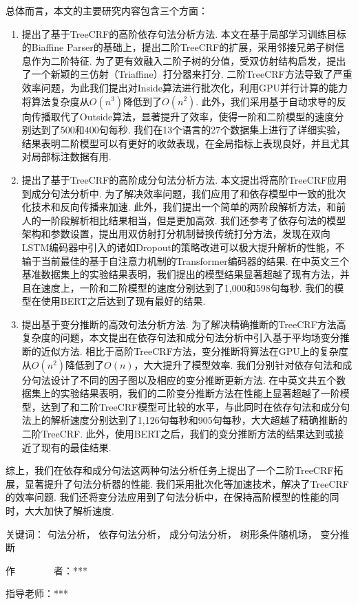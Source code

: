\begin{cabstract}
	总体而言，本文的主要研究内容包含三个方面：
	\begin{enumerate}
		\item 提出了基于TreeCRF的高阶依存句法分析方法.
		      本文在基于局部学习训练目标的Biaffine Parser的基础上，提出二阶TreeCRF的扩展，采用邻接兄弟子树信息作为二阶特征.
		      为了更有效融入二阶子树的分值，受双仿射结构启发，提出了一个新颖的三仿射（Triaffine）打分器来打分.
		      二阶TreeCRF方法导致了严重效率问题，为此我们提出对Inside算法进行批次化，利用GPU并行计算的能力将算法复杂度从$O(n^3)$降低到了$O(n^2)$.
		      此外，我们采用基于自动求导的反向传播取代了Outside算法，显著提升了效率，使得一阶和二阶模型的速度分别达到了500和400句每秒.
		      我们在13个语言的27个数据集上进行了详细实验，结果表明二阶模型可以有更好的收敛表现，在全局指标上表现良好，并且尤其对局部标注数据有用.
		\item 提出了基于TreeCRF的高阶成分句法分析方法.
		      本文提出将高阶TreeCRF应用到成分句法分析中.
		      为了解决效率问题，我们应用了和依存模型中一致的批次化技术和反向传播来加速.
		      此外，我们提出一个简单的两阶段解析方法，和前人的一阶段解析相比结果相当，但是更加高效.
		      我们还参考了依存句法的模型架构和参数设置，提出用双仿射打分机制替换传统打分方法，发现在双向LSTM编码器中引入的诸如Dropout的策略改进可以极大提升解析的性能，不输于当前最佳的基于自注意力机制的Transformer编码器的结果.
		      在中英文三个基准数据集上的实验结果表明，我们提出的模型结果显著超越了现有方法，并且在速度上，一阶和二阶模型的速度分别达到了1,000和598句每秒.
		      我们的模型在使用BERT之后达到了现有最好的结果.
		\item 提出基于变分推断的高效句法分析方法.
		      为了解决精确推断的TreeCRF方法高复杂度的问题，本文提出在依存句法和成分句法分析中引入基于平均场变分推断的近似方法.
		      相比于高阶TreeCRF方法，变分推断将算法在GPU上的复杂度从$O(n^2)$降低到了$O(n)$，大大提升了模型效率.
		      我们分别针对依存句法和成分句法设计了不同的因子图以及相应的变分推断更新方法.
		      在中英文共五个数据集上的实验结果表明，我们的二阶变分推断方法在性能上显著超越了一阶模型，达到了和二阶TreeCRF模型可比较的水平，与此同时在依存句法和成分句法上的解析速度分别达到了1,126句每秒和905句每秒，大大超越了精确推断的二阶TreeCRF.
		      此外，使用BERT之后，我们的变分推断方法的结果达到或接近了现有的最佳结果.
	\end{enumerate}
	
	综上，我们在依存和成分句法这两种句法分析任务上提出了一个二阶TreeCRF拓展，显著提升了句法分析器的性能.
	我们采用批次化等加速技术，解决了TreeCRF的效率问题.
	我们还将变分法应用到了句法分析中，在保持高阶模型的性能的同时，大大加快了解析速度.
	
	\vskip 21bp
	{\heiti{} 关键词：}
	句法分析，
	依存句法分析，
	成分句法分析，
	树形条件随机场，
	变分推断
	
	\begin{flushright}
		作~~~~~~~~者：***
		
		指导老师：***
		
	\end{flushright}
\end{cabstract}


